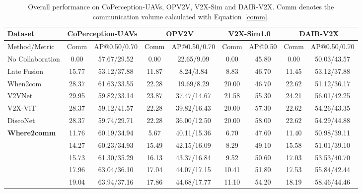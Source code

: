 \begin{table}[!t]
\setlength\tabcolsep{2pt}
\caption{Overall performance on CoPerception-UAVs, OPV2V, V2X-Sim and DAIR-V2X. Comm denotes the communication volume calculated with Equation~\eqref{comm}.}
\begin{small}
\centering
\begin{tabular}{l|cc|cc|cc|cc}
\hline
Dataset                              & \multicolumn{2}{c|}{CoPerception-UAVs}          & \multicolumn{2}{c|}{OPV2V}                      & \multicolumn{2}{c|}{V2X-Sim1.0}          & \multicolumn{2}{c}{DAIR-V2X} \\ \hline
Method/Metric                        & Comm  & AP@0.50/0.70 & Comm  & AP@0.50/0.70 & Comm  & AP@0.50 & Comm   & AP@0.50/0.70  \\ \hline
No Collaboration                              & 0.00     & 57.67/29.52   & 0.00     & 22.65/9.09    & 0.00     &45.80   & 0.00      & 50.03/43.57    \\
Late Fusion                          & 15.77 & 53.12/37.88   & 11.87 & 8.24/3.84    & 8.83 &46.70   & 11.45  & 53.12/37.88    \\
When2com                             & 28.37 & 61.63/33.55   & 22.28 & 19.69/8.29    & 20.00 &46.70  & 22.62  & 51.12/36.17    \\
V2VNet                               & 29.95 & 59.82/33.14   & 23.87 & 37.47/14.67   & 21.58 &55.30   & 24.21  & 56.01/42.25    \\
V2X-ViT                              & 28.37 & 59.12/41.57   & 22.28 & 39.82/16.43   & 20.00 &57.30   & 22.62  & 54.26/43.35    \\
DiscoNet                             & 28.37 & 59.74/29.71   & 22.28 & 36.00/12.50   & 20.00 &58.00   & 22.62  & 54.29/44.88    
\\\hline
\multirow{9}{*}{\textbf{Where2comm}} &11.76 & 60.19/34.94    &5.67 & 40.11/15.36     &6.70 & 47.60   &11.40 & 50.98/39.11    \\
&14.27 & 60.23/34.93    &15.49 & 42.15/16.09    &8.29 & 49.10   &15.58 & 51.01/39.10    \\
&15.73 & 61.30/35.29    &16.13 & 43.37/16.84    &9.52 & 50.60   &17.03 & 53.53/40.70    \\
&17.96 & 63.04/36.10    &17.04 & 44.07/17.15    &10.41 & 51.80  &17.53 & 55.84/42.44    \\
&19.04 & 63.94/37.16    &17.86 & 44.68/17.77    &11.10 & 54.20  &18.19 & 58.46/44.46    \\

\end{tabular}
\end{small}
\end{table}
